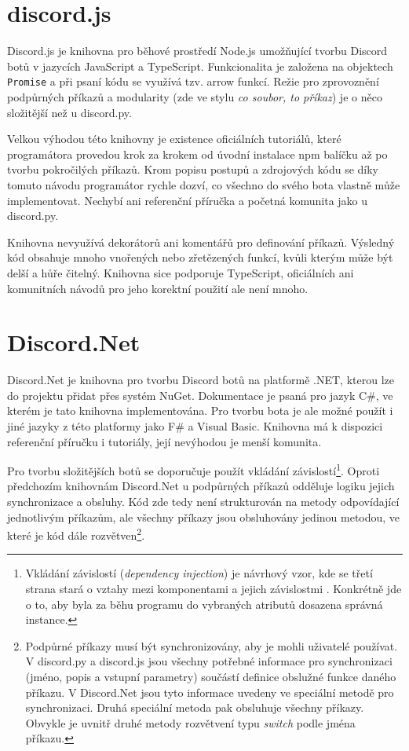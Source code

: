 \documentclass[FM]{tulthesis}
\begin{document}
	\section{discord.js}
	
	Discord.js je knihovna pro běhové prostředí Node.js umožňující tvorbu Discord botů v jazycích JavaScript a TypeScript. Funkcionalita je založena na objektech \verb|Promise| a při psaní kódu se využívá tzv. arrow funkcí. Režie pro zprovoznění podpůrných příkazů a modularity (zde ve stylu \textit{co soubor, to příkaz}) je o něco složitější než u discord.py.
	
	Velkou výhodou této knihovny je existence oficiálních tutoriálů, které programátora provedou krok za krokem od úvodní instalace npm balíčku až po tvorbu pokročilých příkazů. Krom popisu postupů a zdrojových kódu se díky tomuto návodu programátor rychle dozví, co všechno do svého bota vlastně může implementovat. Nechybí ani referenční příručka a početná komunita jako u discord.py.
	
	Knihovna nevyužívá dekorátorů ani komentářů pro definování příkazů. Výsledný kód obsahuje mnoho vnořených nebo zřetězených funkcí, kvůli kterým může být delší a hůře čitelný. Knihovna sice podporuje TypeScript, oficiálních ani komunitních návodů pro jeho korektní použití ale není mnoho.
	
	\section{Discord.Net}
	
	Discord.Net je knihovna pro tvorbu Discord botů na platformě .NET, kterou lze do projektu přidat přes systém NuGet. Dokumentace je psaná pro jazyk C\#, ve kterém je tato knihovna implementována. Pro tvorbu bota je ale možné použít i jiné jazyky z této platformy jako F\# a Visual Basic. Knihovna má k dispozici referenční příručku i tutoriály, její nevýhodou je menší komunita.
	
	 Pro tvorbu složitějších botů se doporučuje použít vkládání závislostí\footnote{Vkládání závislostí (\textit{dependency injection}) je návrhový vzor, kde se třetí strana stará o vztahy mezi komponentami a jejich závislostmi \cite{lit_distributedSystems}. Konkrétně jde o to, aby byla za běhu programu do vybraných atributů dosazena správná instance.}. Oproti předchozím knihovnám Discord.Net u podpůrných příkazů odděluje logiku jejich synchronizace a obsluhy. Kód zde tedy není strukturován na metody odpovídající jednotlivým příkazům, ale všechny příkazy jsou obsluhovány jedinou metodou, ve které je kód dále rozvětven\footnote{Podpůrné příkazy musí být synchronizovány, aby je mohli uživatelé používat. V discord.py a discord.js jsou všechny potřebné informace pro synchronizaci (jméno, popis a vstupní parametry) součástí definice obslužné funkce daného příkazu. V Discord.Net jsou tyto informace uvedeny ve speciální metodě pro synchronizaci. Druhá speciální metoda pak obsluhuje všechny příkazy. Obvykle je uvnitř druhé metody rozvětvení typu \textit{switch} podle jména příkazu.}.
	
\end{document}

